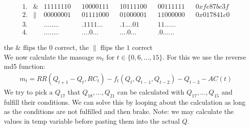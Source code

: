 \begin{align*}    
    1.& \& & 11111110 & & 10000111 & & 10111100 & & 00111111 & & 0xfe87bc3f \\
    2.& \| & 00000001 & & 01111000 & & 01000001 & & 11000000 & & 0x017841c0 \\
    3.&    & ........ & & .1111... & & .1....01 & & 11...... & &  \\
    4.&    & ........ & & ....0... & & ....0... & & .0...... & &  
\end{align*}

  the $\&$ flips the $0$ correct, the $\|$ flips the $1$ correct\\
We now calculate the massage $m_t$ for $t \in \{0,6,\dots,15\} $. For this we use the reverse md5 function:
\begin{align*}
    m_t = RR \left( Q_{t+1} - Q_t , RC_t\right) - f_t \left( Q_t, Q_{t-1}, Q_{t-2} \right) - Q_{t-3} - AC(t)
\end{align*}
\hfill
\newpage
We try to pick a $Q_{17}$ that $Q_{18}, \dots, Q_{21}$ can be calculated with $Q_{17},\dots,Q_{15}$ and fulfill their conditions. 
We can solve this by looping about the calculation as long as the conditions are not fulfilled and then brake. Note: we may calculate the values in temp variable before pasting them into the actual $Q$.\\

